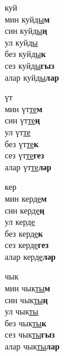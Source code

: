 \begin{multicols}{4}
\begin{enumerate}
\begin{minipage}{\linewidth}
    \item
    куй\\
    мин куй\underline{ды}\textbf{м}\\
    син куй\underline{ды}\textbf{ң}\\
    ул куй\underline{ды}\\
    без куй\underline{ды}\textbf{к}\\
    сез куй\underline{ды}\textbf{гыз}\\
    алар куй\underline{ды}\textbf{лар}\\
\end{minipage}

\begin{minipage}{\linewidth}
    \item
    үт\\
    мин үт\underline{те}\textbf{м}\\
    син үт\underline{те}\textbf{ң}\\
    ул үт\underline{те}\\
    без үт\underline{те}\textbf{к}\\
    сез үт\underline{те}\textbf{гез}\\
    алар үт\underline{те}\textbf{ләр}\\
\end{minipage}

\begin{minipage}{\linewidth}
    \item
    кер\\
    мин кер\underline{де}\textbf{м}\\
    син кер\underline{де}\textbf{ң}\\
    ул кер\underline{де}\\
    без кер\underline{де}\textbf{к}\\
    сез кер\underline{де}\textbf{гез}\\
    алар кер\underline{де}\textbf{ләр}\\
\end{minipage}

\begin{minipage}{\linewidth}
    \item
    чык\\
    мин чык\underline{ты}\textbf{м}\\
    син чык\underline{ты}\textbf{ң}\\
    ул чык\underline{ты}\\
    без чык\underline{ты}\textbf{к}\\
    сез чык\underline{ты}\textbf{гыз}\\
    алар чык\underline{ты}\textbf{лар}\\
\end{minipage}


\end{enumerate}
\end{multicols}
